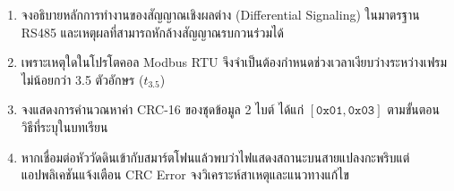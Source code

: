 \begin{enumerate}
    \item จงอธิบายหลักการทำงานของสัญญาณเชิงผลต่าง (Differential Signaling) ในมาตรฐาน RS485 และเหตุผลที่สามารถหักล้างสัญญาณรบกวนร่วมได้
    \item เพราะเหตุใดในโปรโตคอล Modbus RTU จึงจำเป็นต้องกำหนดช่วงเวลาเงียบว่างระหว่างเฟรมไม่น้อยกว่า 3.5 ตัวอักษร ($t_{3.5}$)
    \item จงแสดงการคำนวณหาค่า CRC-16 ของชุดข้อมูล 2 ไบต์ ได้แก่ $[\mathtt{0x01}, \mathtt{0x03}]$ ตามขั้นตอนวิธีที่ระบุในบทเรียน
    \item หากเชื่อมต่อหัววัดดินเข้ากับสมาร์ตโฟนแล้วพบว่าไฟแสดงสถานะบนสายแปลงกะพริบแต่แอปพลิเคชันแจ้งเตือน CRC Error จงวิเคราะห์สาเหตุและแนวทางแก้ไข
\end{enumerate}
